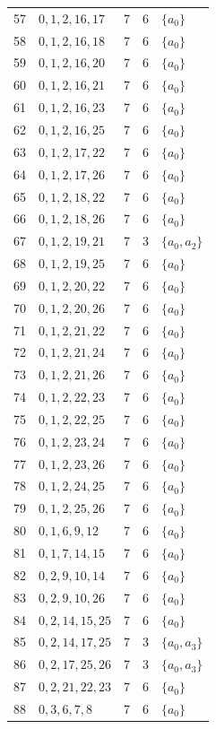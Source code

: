 \begin{longtable}{@{}r l c c l@{}}
57 & $0,1,2,16,17$ & 7 & 6 & $\{a_{0}\}$\\
58 & $0,1,2,16,18$ & 7 & 6 & $\{a_{0}\}$\\
59 & $0,1,2,16,20$ & 7 & 6 & $\{a_{0}\}$\\
60 & $0,1,2,16,21$ & 7 & 6 & $\{a_{0}\}$\\
61 & $0,1,2,16,23$ & 7 & 6 & $\{a_{0}\}$\\
62 & $0,1,2,16,25$ & 7 & 6 & $\{a_{0}\}$\\
63 & $0,1,2,17,22$ & 7 & 6 & $\{a_{0}\}$\\
64 & $0,1,2,17,26$ & 7 & 6 & $\{a_{0}\}$\\
65 & $0,1,2,18,22$ & 7 & 6 & $\{a_{0}\}$\\
66 & $0,1,2,18,26$ & 7 & 6 & $\{a_{0}\}$\\
67 & $0,1,2,19,21$ & 7 & 3 & $\{a_{0},a_{2}\}$\\
68 & $0,1,2,19,25$ & 7 & 6 & $\{a_{0}\}$\\
69 & $0,1,2,20,22$ & 7 & 6 & $\{a_{0}\}$\\
70 & $0,1,2,20,26$ & 7 & 6 & $\{a_{0}\}$\\
71 & $0,1,2,21,22$ & 7 & 6 & $\{a_{0}\}$\\
72 & $0,1,2,21,24$ & 7 & 6 & $\{a_{0}\}$\\
73 & $0,1,2,21,26$ & 7 & 6 & $\{a_{0}\}$\\
74 & $0,1,2,22,23$ & 7 & 6 & $\{a_{0}\}$\\
75 & $0,1,2,22,25$ & 7 & 6 & $\{a_{0}\}$\\
76 & $0,1,2,23,24$ & 7 & 6 & $\{a_{0}\}$\\
77 & $0,1,2,23,26$ & 7 & 6 & $\{a_{0}\}$\\
78 & $0,1,2,24,25$ & 7 & 6 & $\{a_{0}\}$\\
79 & $0,1,2,25,26$ & 7 & 6 & $\{a_{0}\}$\\
80 & $0,1,6,9,12$ & 7 & 6 & $\{a_{0}\}$\\
81 & $0,1,7,14,15$ & 7 & 6 & $\{a_{0}\}$\\
82 & $0,2,9,10,14$ & 7 & 6 & $\{a_{0}\}$\\
83 & $0,2,9,10,26$ & 7 & 6 & $\{a_{0}\}$\\
84 & $0,2,14,15,25$ & 7 & 6 & $\{a_{0}\}$\\
85 & $0,2,14,17,25$ & 7 & 3 & $\{a_{0},a_{3}\}$\\
86 & $0,2,17,25,26$ & 7 & 3 & $\{a_{0},a_{3}\}$\\
87 & $0,2,21,22,23$ & 7 & 6 & $\{a_{0}\}$\\
88 & $0,3,6,7,8$ & 7 & 6 & $\{a_{0}\}$\\

\end{longtable}
